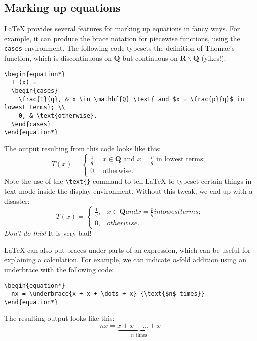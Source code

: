 \documentclass{article}
\newcommand*{\code}[1]{\texttt{#1}}
\begin{document}
\subsection{Marking up equations}
\LaTeX{} provides several features for marking up equations in fancy ways.
For example, it can produce the brace notation for piecewise functions, using the \code{cases} environment.
The following code typesets the definition of Thomae's function, which is discontinuous on $\mathbf{Q}$ but continuous on $\mathbf{R} \backslash \mathbf{Q}$ (yikes!):
\begin{verbatim}
\begin{equation*}
  T (x) =
  \begin{cases}
    \frac{1}{q}, & x \in \mathbf{Q} \text{ and $x = \frac{p}{q}$ in lowest terms}; \\
    0, & \text{otherwise}.
  \end{cases}
\end{equation*}
\end{verbatim}
The output resulting from this code looks like this:
\begin{equation*}
  T (x) =
  \begin{cases}
    \frac{1}{q}, & x \in \mathbf{Q} \text{ and $x = \frac{p}{q}$ in lowest terms}; \\
    0, & \text{otherwise}.
  \end{cases}
\end{equation*}
Note the use of the \code{\textbackslash{}text\{\}} command to tell \LaTeX{} to typeset certain things in text mode inside the display environment.
Without this tweak, we end up with a disaster:
\begin{equation*}
  T (x) =
  \begin{cases}
    \frac{1}{q}, & x \in \mathbf{Q} and x = \frac{p}{q} in lowest terms; \\
    0, & otherwise.
  \end{cases}
\end{equation*}
\emph{Don't do this!}
It is very bad!

\LaTeX{} can also put braces under parts of an expression, which can be useful for explaining a calculation.
For example, we can indicate $n$-fold addition using an underbrace with the following code:
\begin{verbatim}
\begin{equation*}
  nx = \underbrace{x + x + \dots + x}_{\text{$n$ times}}
\end{equation*}
\end{verbatim}
The resulting output looks like this:
\begin{equation*}
  nx = \underbrace{x + x + \dots + x}_{\text{$n$ times}}
\end{equation*}
\end{document}
